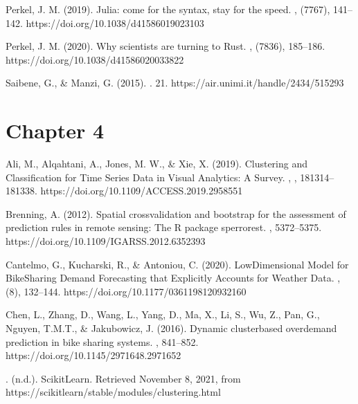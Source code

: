 \documentclass[letterpaper,10pt,english]{jupyterBook}
\begin{document}
\sphinxAtStartPar
Perkel, J. M. (2019). Julia: come for the syntax, stay for the speed. , (7767), 141–142. https://doi.org/10.1038/d41586\sphinxhyphen{}019\sphinxhyphen{}02310\sphinxhyphen{}3

\sphinxAtStartPar
Perkel, J. M. (2020). Why scientists are turning to Rust. , (7836), 185–186. https://doi.org/10.1038/d41586\sphinxhyphen{}020\sphinxhyphen{}03382\sphinxhyphen{}2

\sphinxAtStartPar
Saibene, G., \& Manzi, G. (2015). . 21. https://air.unimi.it/handle/2434/515293


\section{Chapter 4}
\label{\detokenize{references:chapter-4}}
\sphinxAtStartPar
Ali, M., Alqahtani, A., Jones, M. W., \& Xie, X. (2019). Clustering and Classification for Time Series Data in Visual Analytics: A Survey. , , 181314–181338. https://doi.org/10.1109/ACCESS.2019.2958551

\sphinxAtStartPar
Brenning, A. (2012). Spatial cross\sphinxhyphen{}validation and bootstrap for the assessment of prediction rules in remote sensing: The R package sperrorest. , 5372–5375. https://doi.org/10.1109/IGARSS.2012.6352393

\sphinxAtStartPar
Cantelmo, G., Kucharski, R., \& Antoniou, C. (2020). Low\sphinxhyphen{}Dimensional Model for Bike\sphinxhyphen{}Sharing Demand Forecasting that Explicitly Accounts for Weather Data. , (8), 132–144. https://doi.org/10.1177/0361198120932160

\sphinxAtStartPar
Chen, L., Zhang, D., Wang, L., Yang, D., Ma, X., Li, S., Wu, Z., Pan, G., Nguyen, T.\sphinxhyphen{}M.\sphinxhyphen{}T., \& Jakubowicz, J. (2016). Dynamic cluster\sphinxhyphen{}based over\sphinxhyphen{}demand prediction in bike sharing systems. , 841–852. https://doi.org/10.1145/2971648.2971652

\sphinxAtStartPar
{}. (n.d.). Scikit\sphinxhyphen{}Learn. Retrieved November 8, 2021, from https://scikit\sphinxhyphen{}learn/stable/modules/clustering.html
\end{document}
